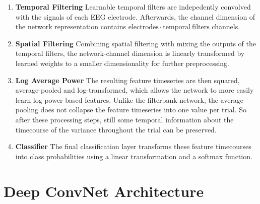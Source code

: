 \begin{enumerate}
\item
\textbf{Temporal Filtering} Learnable temporal filters are indepedently convolved with the signals
of each EEG electrode. Afterwards, the channel dimension of the network
representation contains
\(\mathrm{electrodes} \cdot \mathrm{temporal~ filters}\) channels. 

\item
\textbf{Spatial Filtering} Combining spatial filtering with mixing the
outputs of the temporal filters, the network-channel dimension is
linearly transformed by learned weights to a smaller dimensionality for
further preprocessing. 

\item
\textbf{Log Average Power} The resulting feature timeseries are then squared, average-pooled and log-transformed, which allows the network to more easily learn log-power-based features. Unlike the filterbank network, the average pooling does not collapse the feature timeseries into one value per trial. So after these processing steps, still some temporal information about the timecourse of the variance throughout the trial can be preserved. 

\item
\textbf{Classifier} The final classification layer transforms these feature timecourses into class probabilities using a linear transformation and a softmax function.
\end{enumerate}



\section{Deep ConvNet Architecture}\label{deep-convnet-architecture}

